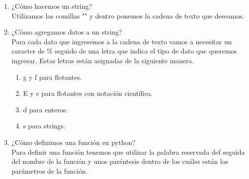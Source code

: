 \documentclass[letterpaper, 12pt, oneside]{article}%
\begin{document}
\begin{enumerate}
		\item ¿Cómo hacemos un string? \\ Utilizamos las comillas "" y dentro ponemos la cadena de texto que deseamos.
		\item ¿Cómo agregamos datos a un string? \\ Para cada dato que ingresemos a la cadena de texto vamos a necesitar un caracter de \% seguido de una letra que indica el tipo de dato que queremos ingresar. Estas letras están asignadas de la siguiente manera.
		\begin{enumerate}
			\item g y f para flotantes.
			\item E y e para flotantes con notación científica.
			\item d para enteros.
			\item s para strings.
		\end{enumerate}
		\item ¿Cómo definimos una función en python? \\ Para definir una función tenemos que utilizar la palabra reservada def seguida del nombre de la función y unos paréntesis dentro de los cuáles están los parámetros de la función.
	\end{enumerate}
\end{document}
